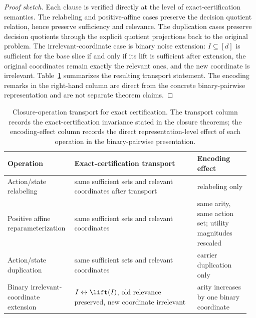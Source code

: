\begin{proof}[Proof sketch]
Each clause is verified directly at the level of exact-certification semantics. The relabeling and positive-affine cases preserve the decision quotient relation, hence preserve sufficiency and relevance. The duplication cases preserve decision quotients through the explicit quotient projections back to the original problem. The irrelevant-coordinate case is binary noise extension: $I \subseteq [d]$ is sufficient for the base slice if and only if its lift is sufficient after extension, the original coordinates remain exactly the relevant ones, and the new coordinate is irrelevant. Table~\ref{tab:closure-operation-transport} summarizes the resulting transport statement. The encoding remarks in the right-hand column are direct from the concrete binary-pairwise representation and are not separate theorem claims.
\end{proof}

\begin{table}[h]
\centering
\small
\setlength{\tabcolsep}{4pt}
\renewcommand{\arraystretch}{1.12}
\renewcommand{\tabularxcolumn}[1]{m{#1}}
\begin{tabularx}{\linewidth}{@{}>{\raggedright\arraybackslash}m{0.26\linewidth}>{\raggedright\arraybackslash}m{0.49\linewidth}>{\raggedright\arraybackslash}m{0.21\linewidth}@{}}
\toprule
\textbf{Operation} & \textbf{Exact-certification transport} & \textbf{Encoding effect} \\
\midrule
Action/state relabeling & same sufficient sets and relevant coordinates after transport & relabeling only \\
\midrule
Positive affine reparameterization & same sufficient sets and relevant coordinates & same arity, same action set; utility magnitudes rescaled \\
\midrule
Action/state duplication & same sufficient sets and relevant coordinates & carrier duplication only \\
\midrule
Binary irrelevant-coordinate extension & $I \leftrightarrow \lift(I)$, old relevance preserved, new coordinate irrelevant & arity increases by one binary coordinate \\
\bottomrule
\end{tabularx}
\caption{Closure-operation transport for exact certification. The transport column records the exact-certification invariance stated in the closure theorems; the encoding-effect column records the direct representation-level effect of each operation in the binary-pairwise presentation.}
\label{tab:closure-operation-transport}
\end{table}


